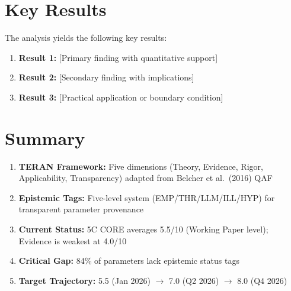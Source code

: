 \documentclass[11pt,a4paper]{article}
\begin{document}


\section{Key Results}
\label{sec:qly-results}

The analysis yields the following key results:

\begin{enumerate}
    \item \textbf{Result 1:} [Primary finding with quantitative support]
    \item \textbf{Result 2:} [Secondary finding with implications]
    \item \textbf{Result 3:} [Practical application or boundary condition]
\end{enumerate}


\section{Summary}

\begin{tcolorbox}[colback=gray!10,colframe=gray!50!black,title=\textbf{Key Results}]
\begin{enumerate}
    \item \textbf{TERAN Framework:} Five dimensions (Theory, Evidence, Rigor, Applicability, Transparency) adapted from Belcher et al.\ (2016) QAF
    
    \item \textbf{Epistemic Tags:} Five-level system (EMP/THR/LLM/ILL/HYP) for transparent parameter provenance
    
    \item \textbf{Current Status:} 5C CORE averages 5.5/10 (Working Paper level); Evidence is weakest at 4.0/10
    
    \item \textbf{Critical Gap:} 84\% of parameters lack epistemic status tags
    
    \item \textbf{Target Trajectory:} 5.5 (Jan 2026) $\rightarrow$ 7.0 (Q2 2026) $\rightarrow$ 8.0 (Q4 2026)
\end{enumerate}
\end{tcolorbox}
\end{document}
